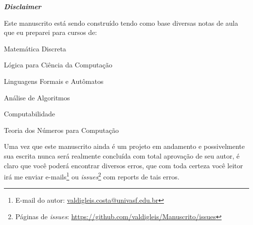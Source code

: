 \begingroup
\thispagestyle{empty}
\begin{center}
	{\normalfont\fontsize{20}{20}\sffamily\selectfont \textbf{\textit{Disclaimer}}}\par
\end{center}

\vspace{1cm}

Este manuscrito está sendo construído tendo como base diversas notas de aula que eu preparei para cursos de:

\begin{multicols}{2}
	\begin{fieldsList}
		\item Matemática Discreta
		\item Lógica para Ciência da Computação
		\item Linguagens Formais e Autômatos
		\item Análise de Algoritmos
		\item Computabilidade
		\item Teoria dos Números para Computação
	\end{fieldsList}
\end{multicols}	

Uma vez que este manuscrito ainda é um projeto em andamento e possivelmente sua escrita nunca será realmente concluída com total aprovação de seu autor, é claro que você poderá encontrar diversos erros, que com toda certeza você leitor irá me enviar e-mails\footnote{E-mail do autor: \url{valdigleis.costa@univasf.edu.br}} ou \textit{issues}\footnote{Páginas de \textit{issues}: \url{https://github.com/valdigleis/Manuscrito/issues}} com reports de tais erros.



